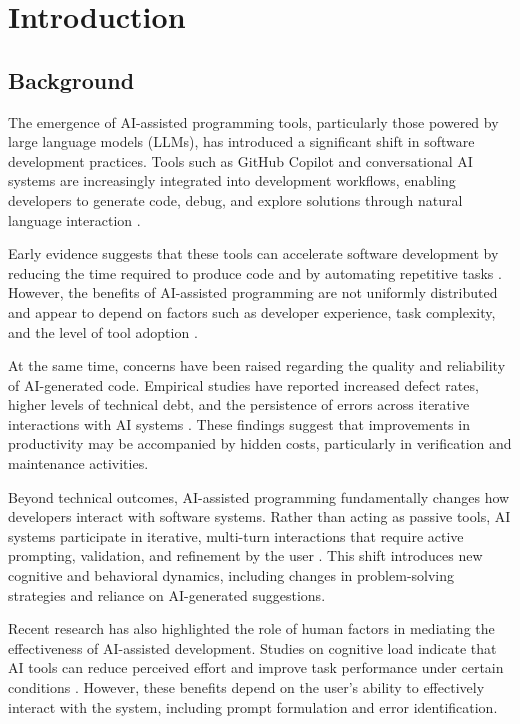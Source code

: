 \documentclass[conference]{IEEEtran}
\begin{document}
\section{Introduction}

\subsection{Background}

The emergence of AI-assisted programming tools, particularly those powered by large language models (LLMs), has introduced a significant shift in software development practices. Tools such as GitHub Copilot and conversational AI systems are increasingly integrated into development workflows, enabling developers to generate code, debug, and explore solutions through natural language interaction \cite{cui_productivity_2024, rasnayaka_empirical_2024}.

Early evidence suggests that these tools can accelerate software development by reducing the time required to produce code and by automating repetitive tasks \cite{kumar_intuition_2025}. However, the benefits of AI-assisted programming are not uniformly distributed and appear to depend on factors such as developer experience, task complexity, and the level of tool adoption \cite{xu_ai-assisted_2026, koripalli_copilot_2025}.

At the same time, concerns have been raised regarding the quality and reliability of AI-generated code. Empirical studies have reported increased defect rates, higher levels of technical debt, and the persistence of errors across iterative interactions with AI systems \cite{sandoval_lost_2022, zhong_developer-llm_2025}. These findings suggest that improvements in productivity may be accompanied by hidden costs, particularly in verification and maintenance activities.

Beyond technical outcomes, AI-assisted programming fundamentally changes how developers interact with software systems. Rather than acting as passive tools, AI systems participate in iterative, multi-turn interactions that require active prompting, validation, and refinement by the user \cite{zhong_developer-llm_2025, pinto_developer_2024}. This shift introduces new cognitive and behavioral dynamics, including changes in problem-solving strategies and reliance on AI-generated suggestions.

Recent research has also highlighted the role of human factors in mediating the effectiveness of AI-assisted development. Studies on cognitive load indicate that AI tools can reduce perceived effort and improve task performance under certain conditions \cite{brachten_ability_2020}. However, these benefits depend on the user's ability to effectively interact with the system, including prompt formulation and error identification.
\end{document}
